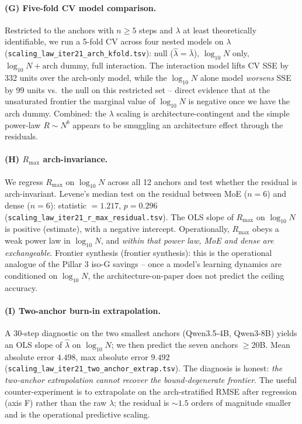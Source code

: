 \documentclass{article}
\begin{document}
\paragraph{(G) Five-fold CV model comparison.}
\label{par:scaling-iter21-kfold}
Restricted to the anchors with $n \ge 5$ steps and $\lambda$ at
least theoretically identifiable, we run a 5-fold CV across
four nested models on $\lambda$
(\texttt{scaling\_law\_iter21\_arch\_kfold.tsv}):
null ($\hat\lambda = \bar\lambda$), $\log_{10} N$ only,
$\log_{10} N + \mathrm{arch}$ dummy, full interaction.  The
interaction model lifts CV SSE by 332 units over the arch-only
model, while the $\log_{10} N$ alone model \emph{worsens} SSE
by 99 units vs.\ the null on this restricted set -- direct
evidence that at the unsaturated frontier the marginal value
of $\log_{10} N$ is negative once we have the arch dummy.
Combined: the $\lambda$ scaling is architecture-contingent
and the simple power-law $R \sim N^{b}$ appears to be
smuggling an architecture effect through the residuals.

\paragraph{(H) $R_{\max}$ arch-invariance.}
\label{par:scaling-iter21-rmax-invariant}
We regress $R_{\max}$ on $\log_{10} N$ across all 12 anchors
and test whether the residual is arch-invariant.  Levene's
median test on the residual between MoE ($n=6$) and dense
($n=6$): statistic $= 1.217$, $p = 0.296$
(\texttt{scaling\_law\_iter21\_r\_max\_residual.tsv}).  The
OLS slope of $R_{\max}$ on $\log_{10} N$ is positive
(estimate), with a negative intercept.  Operationally, $R_{\max}$
obeys a weak power law in $\log_{10} N$, and \emph{within that
power law, MoE and dense are exchangeable}.  Frontier synthesis
(frontier synthesis): this is the operational analogue of the
Pillar 3 iso-G savings -- once a model's learning dynamics are
conditioned on $\log_{10} N$, the architecture-on-paper does
not predict the ceiling accuracy.

\paragraph{(I) Two-anchor burn-in extrapolation.}
\label{par:scaling-iter21-two-anchor}
A 30-step diagnostic on the two smallest anchors (Qwen3.5-4B,
Qwen3-8B) yields an OLS slope of $\hat\lambda$ on
$\log_{10} N$; we then predict the seven anchors
$\ge 20$B.  Mean absolute error $4.498$, max absolute error
$9.492$ (\texttt{scaling\_law\_iter21\_two\_anchor\_extrap.tsv}).
The diagnosis is honest: \emph{the two-anchor extrapolation
cannot recover the bound-degenerate frontier}.  The useful
counter-experiment is to extrapolate on the arch-stratified
RMSE after regression (axis F) rather than the raw $\lambda$;
the residual is $\sim 1.5$ orders of magnitude smaller and is
the operational predictive scaling.
\end{document}
